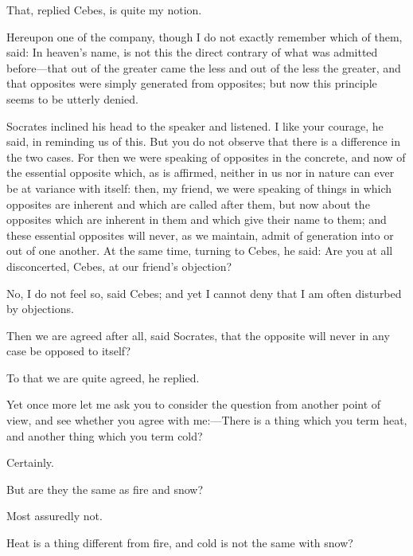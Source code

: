 \documentclass[11pt,letter]{article}
\begin{document}
\par  That, replied Cebes, is quite my notion.

\par  Hereupon one of the company, though I do not exactly remember which of them, said: In heaven's name, is not this the direct contrary of what was admitted before—that out of the greater came the less and out of the less the greater, and that opposites were simply generated from opposites; but now this principle seems to be utterly denied.

\par  Socrates inclined his head to the speaker and listened. I like your courage, he said, in reminding us of this. But you do not observe that there is a difference in the two cases. For then we were speaking of opposites in the concrete, and now of the essential opposite which, as is affirmed, neither in us nor in nature can ever be at variance with itself: then, my friend, we were speaking of things in which opposites are inherent and which are called after them, but now about the opposites which are inherent in them and which give their name to them; and these essential opposites will never, as we maintain, admit of generation into or out of one another. At the same time, turning to Cebes, he said: Are you at all disconcerted, Cebes, at our friend's objection?

\par  No, I do not feel so, said Cebes; and yet I cannot deny that I am often disturbed by objections.

\par  Then we are agreed after all, said Socrates, that the opposite will never in any case be opposed to itself?

\par  To that we are quite agreed, he replied.

\par  Yet once more let me ask you to consider the question from another point of view, and see whether you agree with me:—There is a thing which you term heat, and another thing which you term cold?

\par  Certainly.

\par  But are they the same as fire and snow?

\par  Most assuredly not.

\par  Heat is a thing different from fire, and cold is not the same with snow?
\end{document}
